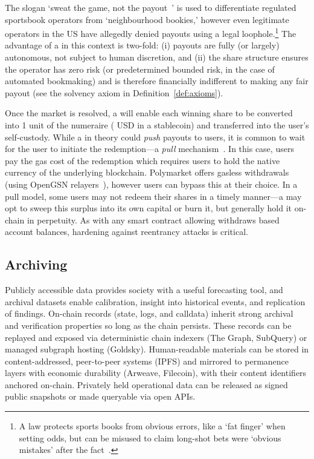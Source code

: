The slogan `sweat the game, not the payout~\cite{Fu24}' is used to differentiate regulated sportsbook operators from `neighbourhood bookies,' however even legitimate operators in the US have allegedly denied payouts using a legal loophole.\footnote{A law protects sports books from obvious errors, like a `fat finger' when setting odds, but can be misused to claim long-shot bets were `obvious mistakes' after the fact~\cite{Fu24}.} The advantage of a \depm in this context is two-fold: (i) payouts are fully (or largely) autonomous, not subject to human discretion, and (ii) the share structure ensures the operator has zero risk (or predetermined bounded risk, in the case of automated bookmaking) and is therefore financially indifferent to making any fair payout (see the solvency axiom in Definition~\ref{def:axioms}).



Once the market is resolved, a \depm will enable each winning share to be converted into 1 unit of the numeraire ( USD in a stablecoin) and transferred into the user's self-custody. While a \depm in theory could \textit{push} payouts to users, it is common to wait for the user to initiate the redemption---a \textit{pull} mechanism~\cite{ctf}. In this case, users pay the gas cost of the redemption which requires users to hold the native currency of the underlying blockchain. Polymarket offers gasless withdrawals (using OpenGSN relayers~\cite{gsn}), however users can bypass this at their choice. In a pull model, some users may not redeem their shares in a timely manner---a \depm may opt to sweep this surplus into its own capital or burn it, but \depms generally hold it on-chain in perpetuity. As with any smart contract allowing withdraws based account balances, hardening against reentrancy attacks is critical.



\subsection{Archiving}\label{wf:archive}

Publicly accessible \depm data provides society with a useful forecasting tool, and archival datasets enable calibration, insight into historical events, and replication of findings. On-chain records (state, logs, and calldata) inherit strong archival and verification properties so long as the chain persists. These records can be replayed and exposed via deterministic chain indexers (\eg The Graph, SubQuery) or managed subgraph hosting (\eg Goldsky). Human-readable materials can be stored in content-addressed, peer-to-peer systems (\eg IPFS) and mirrored to permanence layers with economic durability (\eg Arweave, Filecoin), with their content identifiers anchored on-chain. Privately held operational data can be released as signed public snapshots or made queryable via open APIs.

